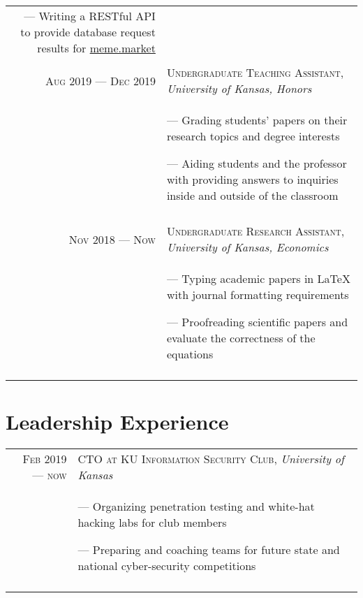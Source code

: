 \documentclass[letterpaper,10pt]{article}
\begin{document}
\begin{tabular}{r|p{11cm}}
{    --- Writing a RESTful API to provide database request results for \href{https://meme.market}{meme.market}
  } \\\multicolumn{2}{c}{}\\
  
  \textsc{Aug 2019 --- Dec 2019} &  \textsc{Undergraduate Teaching Assistant}, \emph{University of Kansas, Honors}\\&\footnotesize{
    --- Grading students' papers on their research topics and degree interests
        
    --- Aiding students and the professor with providing answers to inquiries inside and outside of the classroom
  } \\\multicolumn{2}{c}{}\\
  
  
      \textsc{Nov 2018 --- Now} &  \textsc{Undergraduate Research Assistant}, \emph{University of Kansas, Economics}\\&\footnotesize{
  --- Typing academic papers in \LaTeX{} with journal formatting requirements

  --- Proofreading scientific papers and evaluate the correctness of the equations
  } \\\multicolumn{2}{c}{}\\
  \end{tabular}

\section{Leadership Experience}
\begin{tabular}{r|p{11cm}}
  \textsc{Feb 2019 --- now} &  \textsc{CTO at KU Information Security Club}, \emph{University of Kansas}\\&\footnotesize{
    --- Organizing penetration testing and white-hat hacking labs for club members
    
    
    --- Preparing and coaching teams for future state and national cyber-security competitions
  } \\\multicolumn{2}{c}{}\\
\end{tabular}
\end{document}
